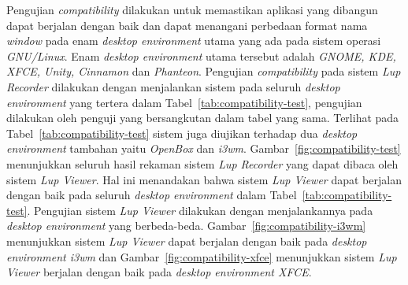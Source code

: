 Pengujian \emph{compatibility} dilakukan untuk memastikan aplikasi yang dibangun
dapat berjalan dengan baik dan dapat menangani perbedaan format nama
\emph{window} pada enam \emph{desktop environment} utama yang ada pada sistem
operasi \emph{GNU/Linux}. Enam \emph{desktop environment} utama tersebut adalah
\emph{GNOME, KDE, XFCE, Unity, Cinnamon} dan \emph{Phanteon}. Pengujian
\emph{compatibility} pada sistem \emph{Lup Recorder} dilakukan dengan
menjalankan sistem pada seluruh \emph{desktop environment} yang tertera dalam
Tabel~\ref{tab:compatibility-test}, pengujian dilakukan oleh penguji yang
bersangkutan dalam tabel yang sama. Terlihat pada
Tabel~\ref{tab:compatibility-test} sistem juga diujikan terhadap dua
\emph{desktop environment} tambahan yaitu \emph{OpenBox} dan \emph{i3wm}.
Gambar~\ref{fig:compatibility-test} menunjukkan seluruh hasil rekaman sistem
\emph{Lup Recorder} yang dapat dibaca oleh sistem \emph{Lup Viewer}. Hal ini
menandakan bahwa sistem \emph{Lup Viewer} dapat berjalan dengan baik pada
seluruh \emph{desktop environment} dalam
Tabel~\ref{tab:compatibility-test}. Pengujian sistem \emph{Lup Viewer} dilakukan
dengan menjalankannya pada \emph{desktop environment} yang
berbeda-beda. Gambar~\ref{fig:compatibility-i3wm} menunjukkan sistem \emph{Lup
  Viewer} dapat berjalan dengan baik pada \emph{desktop environment i3wm} dan
Gambar~\ref{fig:compatibility-xfce} menunjukkan sistem \emph{Lup Viewer}
berjalan dengan baik pada \emph{desktop environment XFCE}.

